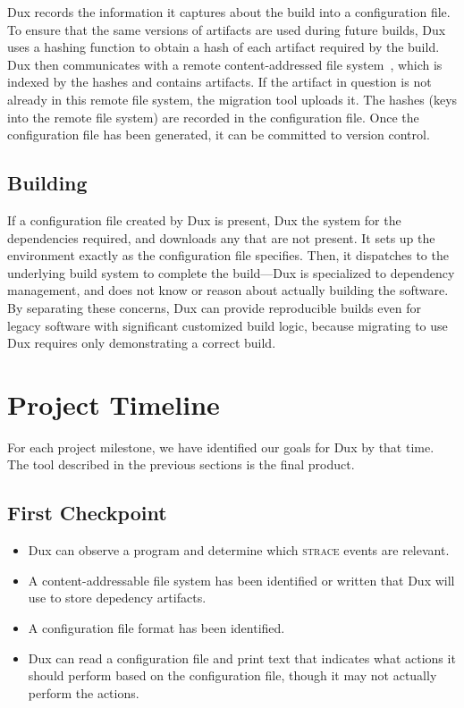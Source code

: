 \documentclass[10pt,conference]{IEEEtran}
\begin{document}
Dux records the information it captures about the build into a configuration file.
To ensure that the same versions of artifacts are used during future builds,
Dux uses a hashing function to obtain a hash of each artifact required by the build.
Dux then communicates with a remote content-addressed file system~\cite{venti},
which is indexed by the hashes and contains artifacts.
If the artifact in question is not already in this remote file system, the migration tool uploads it.
The hashes (keys into the remote file system) are recorded in the configuration file.
Once the configuration file has been generated, it can be committed to version control.

\subsection{Building}

If a configuration file created by Dux is present, Dux the system for the dependencies required,
and downloads any that are not present.
It sets up the environment exactly as the configuration file specifies.
Then, it dispatches to the underlying build system to complete the build---Dux is specialized
to dependency management, and does not know or reason about actually building the software.
By separating these concerns, Dux can provide reproducible builds even for legacy software
with significant customized build logic, because migrating to use Dux requires only
demonstrating a correct build.

\section{Project Timeline}

For each project milestone, we have identified our goals for Dux by that time. The tool described
in the previous sections is the final product.

\subsection{First Checkpoint}

\begin{itemize}
\item{Dux can observe a program and determine which \textsc{strace} events are relevant.}
\item{A content-addressable file system has been identified or written
that Dux will use to store depedency artifacts.}
\item{A configuration file format has been identified.}
\item{Dux can read a configuration file and print text that indicates what actions it
should perform based on the configuration file, though it may not actually perform the actions.}
\end{itemize}
\end{document}

